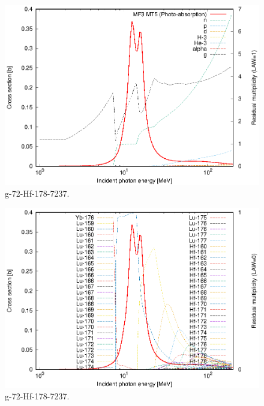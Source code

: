 \begin{figure}
 \includegraphics[width=\linewidth]{eps/g_72-Hf-178_7237.eps}
  \caption{g-72-Hf-178-7237.}
\end{figure}
\begin{figure}
 \includegraphics[width=\linewidth]{eps-law0/g_72-Hf-178_7237.eps}
 \caption{g-72-Hf-178-7237.}
\end{figure}
\newpage \clearpage

